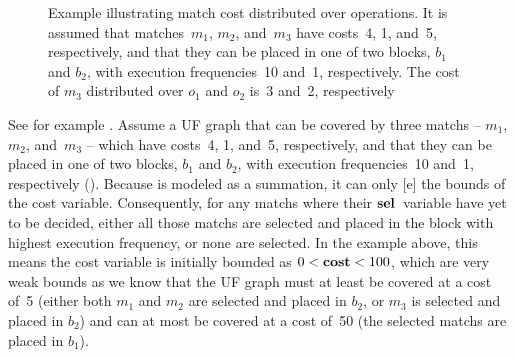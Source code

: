 \begin{figure}
  \caption[Example illustrating match cost distributed over operations]%
          {%
            Example illustrating match cost distributed over operations.
            It is assumed that matches~$m_1$, $m_2$, and~$m_3$ have costs~4,
            1, and~5, respectively, and that they can be placed in one of two
            blocks, $b_1$ and $b_2$, with execution frequencies~10 and~1,
            respectively.
            The cost of $m_3$ distributed over $o_1$ and $o_2$ is~3 and~2,
            respectively%
          }
\end{figure}
%
See for example .
%
Assume a \gls{UF graph} that can be covered by three \glspl{match} -- $m_1$,
$m_2$, and~$m_3$ -- which have costs~4, 1, and~5, respectively, and that they
can be placed in one of two blocks, $b_1$ and $b_2$, with execution
frequencies~10 and~1, respectively ().
%
Because  is modeled as a summation, it can
only [e] the bounds of the \gls{cost variable}.
%
Consequently, for any \glspl{match} where their $\mVar{sel}$~\gls{variable} have
yet to be decided, either all those \glspl{match} are selected and placed in the
\gls{block} with highest execution frequency, or none are selected.
%
In the example above, this means the \gls{cost variable} is initially bounded as
\mbox{$0 < \mVar{cost} < 100$}, which are very weak bounds as we know that the
\gls{UF graph} must at least be covered at a cost of~5 (either both $m_1$ and
$m_2$ are selected and placed in $b_2$, or $m_3$ is selected and placed in
$b_2$) and can at most be covered at a cost of~50 (the selected \glspl{match}
are placed in $b_1$).

